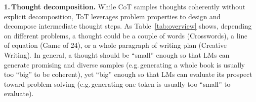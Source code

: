 \documentclass{article}
\begin{document}


\textbf{1.\,Thought decomposition.} While CoT samples thoughts coherently without explicit decomposition, ToT leverages problem properties to design and decompose intermediate thought steps. As Table~\ref{tab:overview} shows, depending on different problems, a thought could be a couple of words (Crosswords), a line of equation (Game of 24), or a whole paragraph of writing plan (Creative Writing). In general, a thought should be ``small'' enough so that LMs can generate promising and diverse samples (e.g.\,generating a whole book is usually too ``big'' to be coherent), yet ``big'' enough so that LMs can evaluate its prospect toward problem solving (e.g.\,generating one token is usually too ``small'' to evaluate). %
\end{document}
